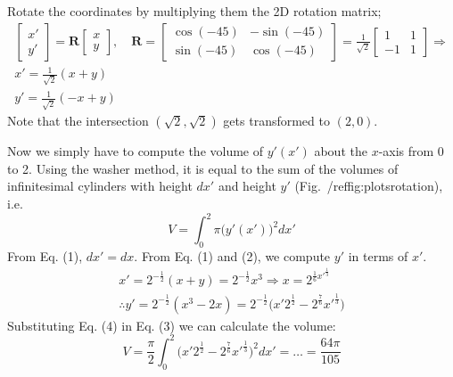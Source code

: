 \documentclass[a4paper]{article}
\begin{document}
Rotate the coordinates by multiplying them the 2D rotation matrix;
\begin{gather*}
	\begin{bmatrix}
	x' \\ y'
	\end{bmatrix}	=
	\textbf{R}	
	\begin{bmatrix}
	x \\ y	
	\end{bmatrix}, \quad 
	\textbf{R} = 
	\begin{bmatrix}
		\cos(-45)	& -\sin(-45)\\
		\sin(-45) & \cos(-45)
	\end{bmatrix} = 
	\frac{1}{\sqrt{2}}
	\begin{bmatrix}
	1 & 1\\
	-1 & 1	
	\end{bmatrix} \Rightarrow
	 \\
	x' = \frac{1}{\sqrt{2}}(x+y) \tag{1} \\
	y' = \frac{1}{\sqrt{2}}(-x+y) \tag{2} 
\end{gather*}
Note that the intersection $(\sqrt{2}, \sqrt{2})$ gets transformed to $(2,0)$.

Now we simply have to compute the volume of $y'(x')$ about the $x$-axis from 0 to 2. Using the washer method, it is equal to the sum of the volumes of infinitesimal  cylinders with height $dx'$ and height $y'$ (Fig.~/ref{fig:plotsrotation}), i.e.
\[
	V = \int_0^2 \pi \big(y'(x')\big)^2 dx'
	\tag{3}
\]
From Eq. (1), $dx'=dx$. From Eq. (1) and (2), we compute $y'$ in terms of $x'$.
\begin{gather*}
	x' = 2^{-\frac{1}{2}} (x+y) = 2^{-\frac{1}{2}} {x^3} \Rightarrow x = 2^{ \frac{1}{6}x'^{\frac{1}{3}}}	\\
	\therefore y'= 2^{-\frac{1}{2}} (x^3-2x) = 2^{-\frac{1}{2}} \big(x'2^{\frac{1}{2}} - 2^{\frac{7}{6}}x'^{\frac{1}{3}}\big) \tag{4}
\end{gather*}
Substituting Eq. (4) in Eq. (3) we can calculate the volume:
\[
	V = \frac{\pi}{2} \int_0^2 \big(x'2^{\frac{1}{2}} - 2^{\frac{7}{6}}x'^{\frac{1}{3}})^2dx' = \ldots = \frac{64\pi}{105} 
\]





\end{document}
